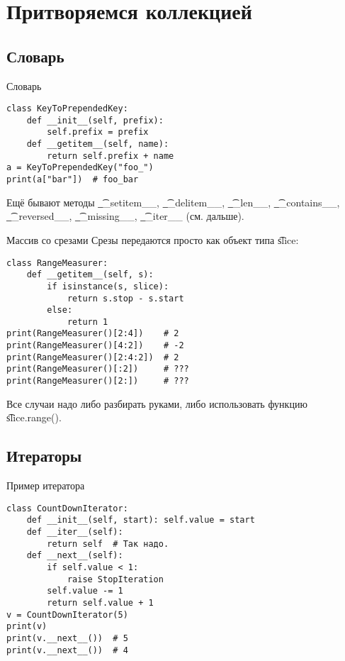 \section{Притворяемся коллекцией}
\subsection{Словарь}
\begin{frame}
\end{frame}

\begin{frame}[fragile]{Словарь}
\begin{verbatim}
class KeyToPrependedKey:
    def __init__(self, prefix):
        self.prefix = prefix
    def __getitem__(self, name):
        return self.prefix + name
a = KeyToPrependedKey("foo_")
print(a["bar"])  # foo_bar
\end{verbatim}
	Ещё бывают методы \t{\_\_setitem\_\_}, \t{\_\_delitem\_\_}, \t{\_\_len\_\_}, \t{\_\_contains\_\_}, \t{\_\_reversed\_\_}, \t{\_\_missing\_\_}, \t{\_\_iter\_\_} (см. дальше).
\end{frame}

\begin{frame}[fragile]{Массив со срезами}
	Срезы передаются просто как объект типа \t{slice}:
\begin{verbatim}
class RangeMeasurer:
    def __getitem__(self, s):
        if isinstance(s, slice):
            return s.stop - s.start
        else:
            return 1
print(RangeMeasurer()[2:4])    # 2
print(RangeMeasurer()[4:2])    # -2
print(RangeMeasurer()[2:4:2])  # 2
print(RangeMeasurer()[:2])     # ???
print(RangeMeasurer()[2:])     # ???
\end{verbatim}
	\pause
	Все случаи надо либо разбирать руками, либо использовать функцию \t{slice.range()}.
\end{frame}

\subsection{Итераторы}
\begin{frame}
\end{frame}

\begin{frame}[fragile]{Пример итератора}
\begin{verbatim}
class CountDownIterator:
    def __init__(self, start): self.value = start
    def __iter__(self):
        return self  # Так надо.
    def __next__(self):
        if self.value < 1:
            raise StopIteration
        self.value -= 1
        return self.value + 1
v = CountDownIterator(5)
print(v)
print(v.__next__())  # 5
print(v.__next__())  # 4
\end{verbatim}
\end{frame}


